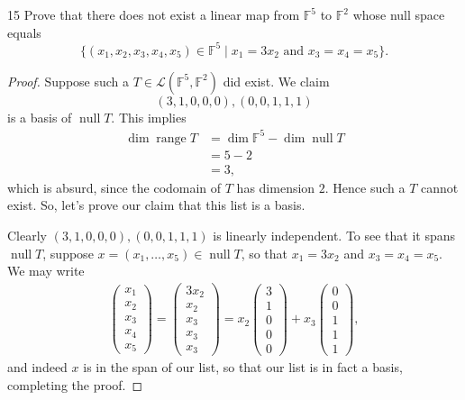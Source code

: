 \documentclass[11pt]{extarticle}
\newenvironment{problem}[1]{\begin{prob*}{#1}{}}{\end{prob*}}
\newcommand{\F}{\mathbb{F}}
\newcommand{\Hom}{\mathcal{L}}
\DeclareMathOperator{\Null}{null}
\DeclareMathOperator{\Range}{range}
\begin{document}
\begin{problem}{15}
Prove that there does not exist a linear map from $\F^5$ to $\F^2$ whose null space equals
\begin{equation*}
\{(x_1,x_2,x_3,x_4,x_5)\in\F^5\mid x_1=3x_2 \text{ and }x_3 = x_4 = x_5\}.
\end{equation*}
\end{problem}
\begin{proof}
Suppose such a $T\in\Hom(\F^5, \F^2)$ did exist.  We claim 
\begin{equation*}
(3, 1, 0, 0, 0), (0, 0, 1, 1, 1)
\end{equation*}
is a basis of $\Null T$.  This implies
\begin{align*}
\dim \Range T &= \dim\F^5 - \dim \Null T\\
&= 5 - 2\\
&= 3,
\end{align*}
which is absurd, since the codomain of $T$ has dimension $2$.  Hence such a $T$ cannot exist.  So, let's prove our claim that this list is a basis.
\par Clearly $(3, 1, 0, 0, 0), (0, 0, 1, 1, 1)$ is linearly independent.  To see that it spans $\Null T$, suppose $x=(x_1,\dots,x_5)\in\Null T$, so that $x_1=3x_2$ and $x_3 = x_4 = x_5$.  We may write
\begin{align*}
\begin{pmatrix}x_1\\x_2\\x_3\\x_4\\x_5 \end{pmatrix} = \begin{pmatrix}3x_2\\x_2\\x_3\\x_3\\x_3 \end{pmatrix} = x_2\begin{pmatrix}3\\1\\0\\0\\0\end{pmatrix}  + x_3\begin{pmatrix}0\\0\\1\\1\\1\end{pmatrix},
\end{align*}
and indeed $x$ is in the span of our list, so that our list is in fact a basis, completing the proof.
\end{proof}
\end{document}
